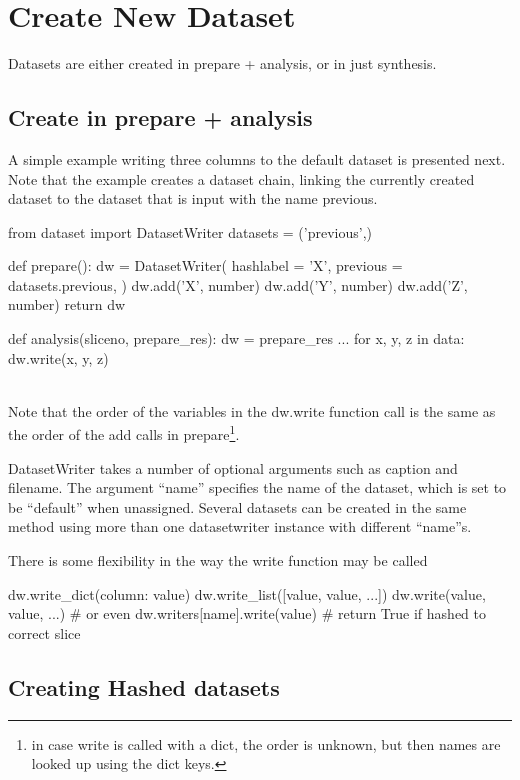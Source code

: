\newpage
\section{Create New Dataset}
Datasets are either created in prepare + analysis, or in just
synthesis.

\subsection{Create in prepare + analysis}
A simple example writing three columns to the default dataset is
presented next.  Note that the example creates a dataset chain,
linking the currently created dataset to the dataset that is input
with the name previous.

\begin{python}
from dataset import DatasetWriter
datasets = ('previous',)

def prepare():
  dw = DatasetWriter(
    hashlabel = 'X',
    previous = datasets.previous,
  )
  dw.add('X', number)
  dw.add('Y', number)
  dw.add('Z', number)
  return dw

def analysis(sliceno, prepare_res):
  dw = prepare_res
  ...
  for x, y, z in data:
    dw.write(x, y, z)
\end{python}
\\
Note that the order of the variables in the dw.write function call is
the same as the order of the add calls in prepare\footnote{in case
  write is called with a dict, the order is unknown, but then names
  are looked up using the dict keys.}.

DatasetWriter takes a number of optional arguments such as caption and
filename.  The argument ``name'' specifies the name of the dataset,
which is set to be ``default'' when unassigned.  Several datasets can
be created in the same method using more than one datasetwriter
instance with different ``name''s.

There is some flexibility in the way the write function may be called

\begin{python}
  dw.write_dict({column: value})
  dw.write_list([value, value, ...])
  dw.write(value, value, ...)
  # or even
  dw.writers[name].write(value)  # return True if hashed to correct slice
\end{python}



\subsection{Creating Hashed datasets}

